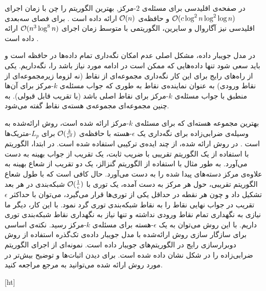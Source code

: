در صفحه‌ی اقلیدسی‌ برای مسئله‌ی $2$-مرکز, بهترین الگوریتم را چن   با زمان اجرای $\mathcal{O}(c \log^2{n} \log^2{\log{n}})$ و حافظه‌ی $\mathcal{O}(n)$ ارائه داده است . برای فصای سه‌بعدی اقلیدسی نیز آگاروال و سایرین، الگوریتمی با متوسط‌ زمان اجرای $\mathcal{O}(n^3\log^8{n})$ ارائه داده است .


در مدل جویبار داده، مشکل اصلی عدم امکان نگه‌داری تمام داده‌ها در حافظه است و باید سعی شود تنها داده‌هایی که ممکن است در ادامه مورد نیاز باشد را، نگه‌داریم. یکی از راه‌های رایج برای این کار نگه‌داری مجموعه‌ای از‌ نقاط (نه لزوما زیرمجموعه‌ای از نقاط‌ ورودی) به عنوان نماینده‌ی نقاط‌ به طوری که جواب مسئله‌ی $k$-مرکز برای آن‌ها منطبق‌ با جواب مسئله‌ی $k$-مرکز‌ برای نقاط‌ اصلی باشد (با تقریب قابل قبولی). به چنین مجموعه‌ای مجموعه‌ی هسته‌ی نقاط‌ گفته می‌شود. 

بهترین مجموعه‌ هسته‌ای که برای مسئله‌ی $k$-مرکز‌ ارائه شده است، روش ارائه‌شده به وسیله‌ی ضرابی‌زاده برای نگه‌داری یک $\epsilon$-هسته با حافظه‌ی $\mathcal{O}(\frac{k}{\epsilon^d})$ برای $L_p$-متریک‌ها است . در روش ارائه شده، از چند ایده‌ی ترکیبی استفاده شده است. در ابتدا، الگوریتم با استفاده از یک الگوریتم تقریبی با ضریب ثابت، یک تقریب از جواب بهینه به دست می‌آورد. به طور مثال با استفاده از‌ الگوریتم گنزالز، یک دو تقریب از شعاع بهینه به علاوه‌ی مرکز‌ دسته‌های پیدا شده را به دست می‌آورد. حال کافی است که با طول شعاع الگوریتم تقریبی، حول هر مرکز‌ به دست آمده، یک توری با $\mathcal{O}(\frac{1}{\epsilon})$ شبکه‌بندی در هر بعد تشکیل داد و چون هر نقطه در حداقل یکی از توری‌ها قرار می‌گیرد، می‌توان با حداکثر $\epsilon$ تقریب در جواب نهایی نقاط را به نقاط شبکه‌بندی توری گرد نمود. با این کار، دیگر ما نیازی به نگهداری تمام نقاط ورودی نداشته و تنها نیاز به نگهداری نقاط شبکه‌بندی توری داریم. با این‌ روش می‌توان به یک $\epsilon$-هسته برای مسئله‌ی $k$-مرکز رسید. نکته‌ی اساسی برای سازگار سازی روش ارائه‌شده با مدل جویبار داده‌ی تک‌گذره استفاده از روش دوبرارسازی رایج در الگوریتم‌های جویبار داده است. نمونه‌ای از اجرای الگوریتم ضرابی‌زاده را در شکل  نشان داده شده است. برای دیدن اثبات‌ها و توضیح بیش‌تر در مورد روش ارائه شده می‌توانید به مرجع  مراجعه کنید.

[ht]

